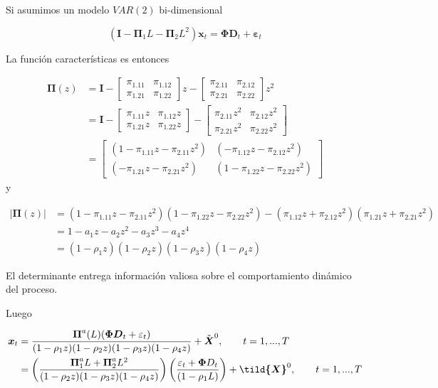 \documentclass[12pt, twoside]{book}\usepackage[]{graphicx}\usepackage[]{color}
\let\bold\boldsymbol
\numberwithin{equation}{section}
\numberwithin{theorem}{section}
\numberwithin{teorema}{section}
\numberwithin{defi}{section}
\numberwithin{prop}{section}
\numberwithin{defi}{section}
\theoremstyle{plain}
\begin{document}
{Si asumimos un modelo $VAR(2)$ bi-dimensional

\begin{equation}
(\bold{I}-\boldsymbol{\Pi}_{1}L-\boldsymbol{\Pi}_{2}L^{2})\bold{x}_{t} = \boldsymbol{\Phi}\bold{D}_{t}+\bold{\varepsilon}_{t}
\end{equation}

La función características es entonces 

\begin{align}
\bold{\Pi}(z) & = \bold{I}-\left[\begin{array}{cc} 
\pi_{1.11} & \pi_{1.12} \\
\pi_{1.21} & \pi_{1.22}
\end{array}\right]z- \left[\begin{array}{cc} 
\pi_{2.11} & \pi_{2.12} \\
\pi_{2.21} & \pi_{2.22}
\end{array}\right]z^{2} \\
              & = \bold{I}-\left[\begin{array}{cc} 
\pi_{1.11}z & \pi_{1.12}z \\
\pi_{1.21}z & \pi_{1.22}z
\end{array}\right]- \left[\begin{array}{cc} 
\pi_{2.11}z^{2} & \pi_{2.12}z^{2} \\
\pi_{2.21}z^{2} & \pi_{2.22}z^{2}
\end{array}\right] \\
 & = \left[\begin{array}{cc} (1-\pi_{1.11}z-\pi_{2.11}z^{2}) & (-\pi_{1.12}z-\pi_{2.12}z^{2}) \\ 
 (-\pi_{1.21}z-\pi_{2.21}z^{2}) & (1-\pi_{1.22}z-\pi_{2.22}z^{2})
 \end{array}\right]
\end{align}
y 

\begin{align}
|\boldsymbol{\Pi}(z)| & = (1-\pi_{1.11}z-\pi_{2.11}z^{2})(1-\pi_{1.22}z-\pi_{2.22}z^{2})-(\pi_{1.12}z+\pi_{2.12}z^{2})(\pi_{1.21}z+\pi_{2.21}z^{2}) \\ 
& = 1-a_{1}z-a_{2}z^{2}-a_{3}z^{3}-a_{4}z^{4} \\ 
& = (1-\rho_{1}z)(1-\rho_{2}z)(1-\rho_{3}z)(1-\rho_{4}z)
\end{align}

El determinante entrega información valiosa sobre el comportamiento dinámico del proceso. 

Luego 

\begin{align}
\bold{x}_{t} & = \frac{\boldsymbol{\Pi}^{a}(L)(\boldsymbol{\Phi}\bold{D}_{t}+\varepsilon_{t})}{(1-\rho_{1}z)(1-\rho_{2}z)(1-\rho_{3}z)(1-\rho_{4}z)}+\tilde{\bold{X}}^{0}, \qquad t=1,...,T \\ 
& = \left(\frac{\bold{\Pi}_{1}^{a}L+\bold{\Pi}^{a}_{2}L^{2}}{(1-\rho_{2}z)(1-\rho_{3}z)(1-\rho_{4}z)}\right)\left(\frac{\varepsilon_{t}+\bold{\Phi}D_{t}}{(1-\rho_{1}L)}\right)+\bold{\tild{X}}^{0}, \qquad t=1,...,T
\end{align}

}
\end{document}
